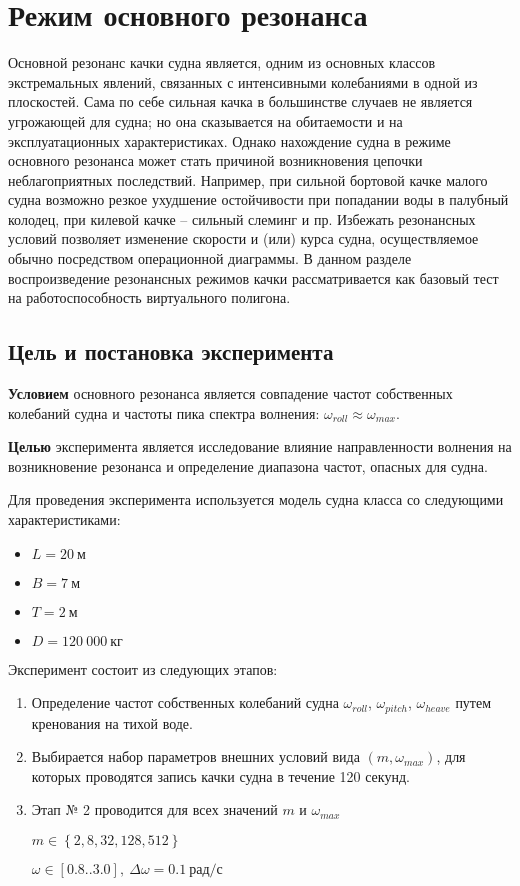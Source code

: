\section{Режим основного резонанса}

Основной резонанс качки судна является, одним из основных классов экстремальных явлений, связанных с интенсивными колебаниями в одной из плоскостей. Сама по себе сильная качка в большинстве случаев не является угрожающей для судна; но она сказывается на обитаемости и на эксплуатационных характеристиках. Однако нахождение судна в режиме основного резонанса может стать причиной возникновения цепочки неблагоприятных последствий. Например, при сильной бортовой качке малого судна возможно резкое ухудшение остойчивости при попадании воды в палубный колодец, при килевой качке – сильный слеминг и пр. Избежать резонансных условий позволяет изменение скорости и (или) курса судна, осуществляемое обычно посредством операционной диаграммы. В данном разделе воспроизведение резонансных режимов качки рассматривается как базовый тест на работоспособность виртуального полигона.

\subsection{Цель и постановка эксперимента}

\textbf{Условием} основного резонанса является совпадение частот собственных колебаний судна и частоты пика спектра волнения: $\omega_{roll} \approx \omega_{max}$.

\textbf{Целью} эксперимента является исследование влияние направленности волнения на возникновение резонанса и определение диапазона частот, опасных для судна.

Для проведения эксперимента используется модель судна класса  со следующими характеристиками:
\begin{itemize}
	\item	$L = 20\ \text{м}$
	\item	$B = 7\ \text{м}$
	\item	$T = 2\ \text{м}$
	\item	$D = 120\ 000\ \text{кг}$
\end{itemize}

Эксперимент состоит из следующих этапов:
\begin{enumerate}
	\item	Определение частот собственных колебаний судна 
			$\omega_{roll}$, $\omega_{pitch}$, $\omega_{heave}$ путем кренования на тихой воде.
	\item	Выбирается набор параметров внешних условий вида $(m, \omega_{max})$, для которых
			проводятся запись качки судна в течение 120 секунд.
	\item	Этап № 2 проводится для всех значений $m$ и $\omega_{max}$
	
			$m \in \left\lbrace 2,8,32,128,512 \right\rbrace$
			
			$\omega \in [0.8..3.0],\ \Delta\omega=0.1\ \text{рад/с}$ 

\end{enumerate}


